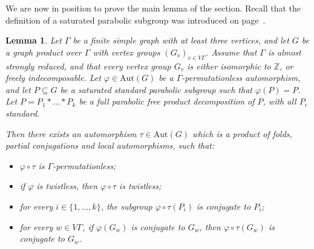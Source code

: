 \documentclass[a4paper,english,11pt]{article}
\newtheorem{lemma}[de]{Lemma}
\theoremstyle{definition}
\theoremstyle{remark}
\newcommand{\Aut}{\mathrm{Aut}}
\begin{document}
We are now in position to prove the main lemma of the section. Recall that the definition of a saturated parabolic subgroup was introduced on page~\pageref{de:saturated}.
  
\begin{lemma}\label{lemma:free-product}
Let $\Gamma$ be a finite simple graph with at least three vertices, and let $G$ be a graph product over $\Gamma$ with vertex groups $(G_v)_{v\in V\Gamma}$. Assume that $\Gamma$ is almost strongly reduced, and that every vertex group $G_v$ is either isomorphic to $\mathbb{Z}$, or freely indecomposable. Let $\varphi\in\Aut(G)$ be a $\Gamma$-permutationless automorphism, and let $P\subseteq G$ be a saturated standard parabolic subgroup such that $\varphi(P)=P$. Let $P=P_1\ast\dots\ast P_k$ be a full parabolic free product decomposition of $P$, with all $P_i$ standard.

Then there exists an automorphism $\tau\in\Aut(G)$ which is a product of folds, partial conjugations and local automorphisms, such that:
\begin{itemize}
\item $\varphi\circ\tau$ is $\Gamma$-permutationless;
\item if $\varphi$ is twistless, then $\varphi\circ\tau$ is twistless;
\item for every $i\in\{1,\dots,k\}$, the subgroup $\varphi\circ\tau(P_i)$ is conjugate to $P_i$;
\item for every $w\in V\Gamma$, if $\varphi(G_{w})$ is conjugate to $G_w$, then $\varphi\circ\tau(G_{w})$ is conjugate to $G_w$.
\end{itemize}
\end{lemma}
\end{document}
